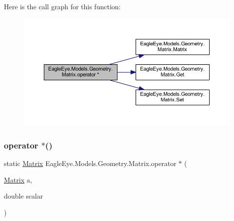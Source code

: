 Here is the call graph for this function\+:\nopagebreak
\begin{figure}[H]
\begin{center}
\leavevmode
\includegraphics[width=350pt]{class_eagle_eye_1_1_models_1_1_geometry_1_1_matrix_a0bf6ba2c5b65b9f438a11908282c2a0c_cgraph}
\end{center}
\end{figure}
\mbox{\label{class_eagle_eye_1_1_models_1_1_geometry_1_1_matrix_a825588a358515f9e6871df1a30354fcc}} 
\subsubsection{\texorpdfstring{operator $\ast$()}{operator *()}\hspace{0.1cm}{\footnotesize\ttfamily [3/4]}}
{\footnotesize\ttfamily static \mbox{\hyperlink{class_eagle_eye_1_1_models_1_1_geometry_1_1_matrix}{Matrix}} Eagle\+Eye.\+Models.\+Geometry.\+Matrix.\+operator $\ast$ (\begin{DoxyParamCaption}\item[{\mbox{\hyperlink{class_eagle_eye_1_1_models_1_1_geometry_1_1_matrix}{Matrix}}}]{a,  }\item[{double}]{scalar }\end{DoxyParamCaption})\hspace{0.3cm}{\ttfamily [static]}}

